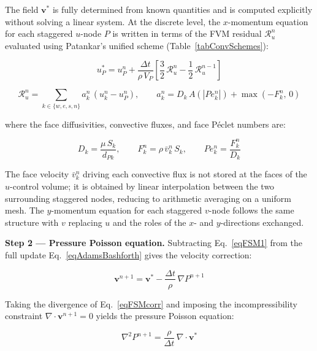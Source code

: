 The field $\mathbf{v}^*$ is fully determined from known quantities and is computed explicitly without solving a linear system. At the discrete level, the $x$-momentum equation for each staggered $u$-node $P$ is written in terms of the FVM residual $\mathcal{R}^n_u$ evaluated using Patankar's unified scheme (Table~\ref{tabConvSchemes}):

\begin{equation}\label{eqNSuPredictor}
    u^*_P = u^n_P + \frac{\Delta t}{\rho\,V_P}\left[\frac{3}{2}\,\mathcal{R}^n_u - \frac{1}{2}\,\mathcal{R}^{n-1}_u\right]
\end{equation}

\begin{equation}\label{eqNSuResidual}
    \mathcal{R}^n_u = \sum_{k \in \{w,e,s,n\}} a^n_k\,(u^n_k - u^n_P), \qquad a^n_k = D_k\,A(|Pe^n_k|) + \max(-F^n_k,\,0)
\end{equation}

where the face diffusivities, convective fluxes, and face Péclet numbers are:

\begin{equation}\label{eqNSuFace}
    D_k = \frac{\mu\,S_k}{d_{Pk}}, \qquad F^n_k = \rho\,\bar{v}^n_k\,S_k, \qquad Pe^n_k = \frac{F^n_k}{D_k}
\end{equation}

The face velocity $\bar{v}^n_k$ driving each convective flux is not stored at the faces of the $u$-control volume; it is obtained by linear interpolation between the two surrounding staggered nodes, reducing to arithmetic averaging on a uniform mesh. The $y$-momentum equation for each staggered $v$-node follows the same structure with $v$ replacing $u$ and the roles of the $x$- and $y$-directions exchanged.

\textbf{Step 2 — Pressure Poisson equation.} Subtracting Eq.~\eqref{eqFSM1} from the full update Eq.~\eqref{eqAdamsBashforth} gives the velocity correction:

\begin{equation}\label{eqFSMcorr}
    \mathbf{v}^{n+1} = \mathbf{v}^* - \frac{\Delta t}{\rho}\,\nabla P^{n+1}
\end{equation}

Taking the divergence of Eq.~\eqref{eqFSMcorr} and imposing the incompressibility constraint $\nabla \cdot \mathbf{v}^{n+1} = 0$ yields the pressure Poisson equation:

\begin{equation}\label{eqPoissonP}
    \nabla^2 P^{n+1} = \frac{\rho}{\Delta t}\,\nabla \cdot \mathbf{v}^*
\end{equation}

